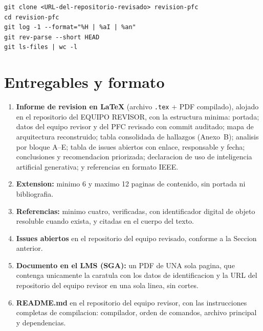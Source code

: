 \documentclass[11pt,a4paper]{article}
\begin{document}
\begin{lstlisting}
git clone <URL-del-repositorio-revisado> revision-pfc
cd revision-pfc
git log -1 --format="%H | %aI | %an"
git rev-parse --short HEAD
git ls-files | wc -l
\end{lstlisting}

\section{Entregables y formato}

\begin{enumerate}
    \item \textbf{Informe de revision en LaTeX} (archivo \texttt{.tex} $+$ PDF compilado), alojado en el repositorio del EQUIPO REVISOR, con la estructura minima: portada; datos del equipo revisor y del PFC revisado con commit auditado; mapa de arquitectura reconstruido; tabla consolidada de hallazgos (Anexo~B); analisis por bloque A--E; tabla de issues abiertos con enlace, responsable y fecha; conclusiones y recomendacion priorizada; declaracion de uso de inteligencia artificial generativa; y referencias en formato IEEE.
    \item \textbf{Extension:} minimo 6 y maximo 12 paginas de contenido, sin portada ni bibliografia.
    \item \textbf{Referencias:} minimo cuatro, verificadas, con identificador digital de objeto resoluble cuando exista, y citadas en el cuerpo del texto.
    \item \textbf{Issues abiertos} en el repositorio del equipo revisado, conforme a la Seccion anterior.
    \item \textbf{Documento en el LMS (SGA):} un PDF de UNA sola pagina, que contenga unicamente la caratula con los datos de identificacion y la URL del repositorio del equipo revisor en una sola linea, sin cortes.
    \item \textbf{README.md} en el repositorio del equipo revisor, con las instrucciones completas de compilacion: compilador, orden de comandos, archivo principal y dependencias.
\end{enumerate}
\end{document}
